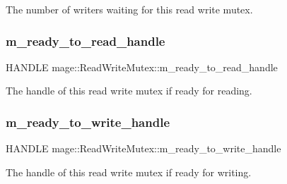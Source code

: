 The number of writers waiting for this read write mutex. \hypertarget{classmage_1_1_read_write_mutex_a65c0ef8b687d48104b09a9d175e72236}{}\label{classmage_1_1_read_write_mutex_a65c0ef8b687d48104b09a9d175e72236} 
\subsubsection{\texorpdfstring{m\+\_\+ready\+\_\+to\+\_\+read\+\_\+handle}{m\_ready\_to\_read\_handle}}
{\footnotesize\ttfamily H\+A\+N\+D\+LE mage\+::\+Read\+Write\+Mutex\+::m\+\_\+ready\+\_\+to\+\_\+read\+\_\+handle\hspace{0.3cm}{\ttfamily [private]}}

The handle of this read write mutex if ready for reading. \hypertarget{classmage_1_1_read_write_mutex_a9498ef85b52486342ba657f34369f89e}{}\label{classmage_1_1_read_write_mutex_a9498ef85b52486342ba657f34369f89e} 
\subsubsection{\texorpdfstring{m\+\_\+ready\+\_\+to\+\_\+write\+\_\+handle}{m\_ready\_to\_write\_handle}}
{\footnotesize\ttfamily H\+A\+N\+D\+LE mage\+::\+Read\+Write\+Mutex\+::m\+\_\+ready\+\_\+to\+\_\+write\+\_\+handle\hspace{0.3cm}{\ttfamily [private]}}

The handle of this read write mutex if ready for writing. 